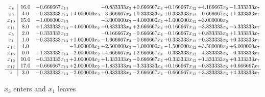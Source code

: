 \documentclass[10pt]{article}
\begin{document}
 \[\begin{array}{c| c c@{\hskip 2pt} c@{\hskip 2pt} c@{\hskip 2pt} c@{\hskip 2pt} c@{\hskip 2pt} c@{\hskip 2pt} c@{\hskip 2pt} }
 x_{8}   &  16.0 & -0.666667 x_{13} &   & -0.833333 x_{3} & + 0.666667 x_{4} & + 0.166667 x_{12} & + 4.166667 x_{6} & -1.333333 x_{7}\\
 x_{9}   &  4.0 & -0.333333 x_{13} & + 4.000000 x_{2} & -3.666667 x_{3} & + 0.333333 x_{4} & + 0.333333 x_{12} & -0.666667 x_{6} & + 1.333333 x_{7}\\
 x_{10}   &  15.0 & -1.000000 x_{13} &   & -3.000000 x_{3} & -4.000000 x_{4} & + 1.000000 x_{12} & + 3.000000 x_{6} &   \\
 x_{11}   &  8.0 & + 1.333333 x_{13} & -4.000000 x_{2} & -0.833333 x_{3} & + 2.666667 x_{4} & + 0.166667 x_{12} & -3.833333 x_{6} & -5.333333 x_{7}\\
 x_{5}   &  2.0 & -0.333333 x_{13} &   & -0.166667 x_{3} & -0.666667 x_{4} & -0.166667 x_{12} & + 0.833333 x_{6} & + 1.333333 x_{7}\\
 x_{1}   &  1.0 & -0.333333 x_{13} & + 1.000000 x_{2} & -1.666667 x_{3} & -0.666667 x_{4} & + 0.333333 x_{12} & + 0.333333 x_{6} & + 0.333333 x_{7}\\
 x_{14}   &  4.0  &   & -1.000000 x_{2} & + 2.500000 x_{3} & -1.000000 x_{4} & -1.500000 x_{12} & + 3.500000 x_{6} & + 6.000000 x_{7}\\
 x_{15}   &  0.0 & + 1.333333 x_{13} & -2.000000 x_{2} & + 4.666667 x_{3} & + 2.666667 x_{4} & -0.333333 x_{12} & -4.333333 x_{6} & -0.333333 x_{7}\\
 x_{16}   &  10.0 & -0.333333 x_{13} & + 3.000000 x_{2} & + 1.333333 x_{3} & -0.666667 x_{4} & + 0.333333 x_{12} & + 1.333333 x_{6} & + 0.333333 x_{7}\\
 x_{17}   &  17.0 & -0.666667 x_{13} & + 2.000000 x_{2} & -1.833333 x_{3} & -3.333333 x_{4} & + 0.166667 x_{12} & -0.833333 x_{6} & + 0.666667 x_{7}\\
\hline
z    &  3.0 & -0.333333 x_{13} & -2.000000 x_{2} & + 0.333333 x_{3} & -2.666667 x_{4} & -0.666667 x_{12} & + 3.333333 x_{6} & + 4.333333 x_{7}\\
\end{array}\]


 $ x_{3} $ enters and $ x_{1} $ leaves 
\end{document}
